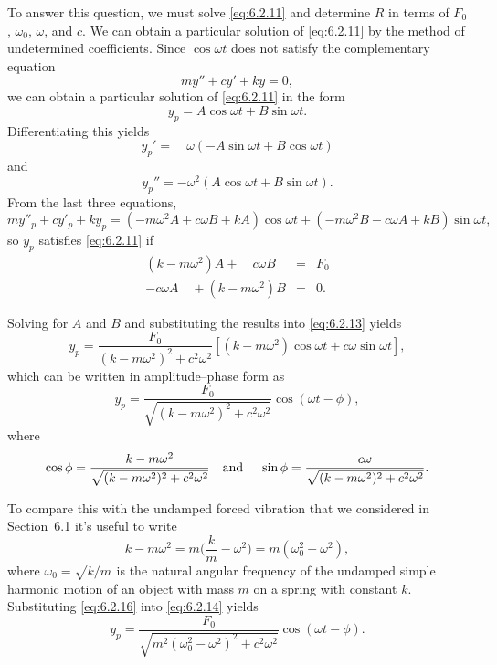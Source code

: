  To answer this question, we must solve \eqref{eq:6.2.11} and determine $R$ in terms of
$F_{0}$, $\omega_{0}$, $\omega$, and $c$. We can obtain a particular solution of \eqref{eq:6.2.11}
by the method of undetermined coefficients. Since $\cos\omega t$ does not satisfy the complementary
equation
\[
  my''+cy'+ky=0,
\]
we can obtain a particular solution of \eqref{eq:6.2.11} in the form
\begin{equation}
  \label{eq:6.2.13}y_{p}=A\cos\omega t+B\sin\omega t.
\end{equation}
Differentiating this yields
\[
  y_{p}'=\quad\omega(-A\sin\omega t+B\cos\omega t)
\]
and
\[
  y_{p}''=-\omega^{2}(A\cos\omega t+B\sin\omega t).
\]
From the last three equations,
\[
  my''_{p}+cy'_{p}+ky_{p}=(-m\omega^{2}A+c\omega B+kA)\cos\omega t+ (-m\omega^{2}B-c\omega A+kB)\sin\omega t,
\]
so $y_{p}$ satisfies \eqref{eq:6.2.11} if
\[
  \begin{array}{lll}
    (k-m\omega^{2})A+\quad c\omega B & = & F_{0} \\
    -c\omega A\quad+(k-m\omega^{2})B & = & 0.
  \end{array}
\]

Solving for $A$ and $B$ and substituting the results into \eqref{eq:6.2.13} yields
\[
  y_{p}=\frac{F_{0}}{(k-m\omega^{2})^{2}+c^{2}\omega^{2}}\left[(k-m\omega^{2})\cos\omega t+c\omega\sin\omega t\right],
\]
which can be written in amplitude--phase form as
\begin{equation}
  \label{eq:6.2.14}%
  y_{p}=\frac{F_{0}}{\sqrt{(k-m\omega^{2})^{2}+c^{2}\omega^{2}}}\cos(\omega t-\phi),
\end{equation}
where
\begin{equation}
  \label{eq:6.2.15}\cos\phi=\frac{k-m\omega^{2}}{\sqrt{(k-m\omega^{2})^{2}+c^{2}\omega^{2}}}\mbox{\quad and \quad}\sin\phi=\frac{c\omega}{\sqrt{(k-m\omega^{2})^{2}+c^{2}\omega^{2}}}.
\end{equation}

To compare this with the undamped forced vibration that we considered in Section~6.1 it's useful to
write
\begin{equation}
  \label{eq:6.2.16}k-m\omega^{2}=m\bigg(\frac{k}{m}-\omega^{2}\bigg)= m(\omega_{0}^{2}-\omega^{2}),
\end{equation}
where $\omega_{0}=\sqrt{k/m}$ is the natural angular frequency of the undamped simple harmonic
motion of an object with mass $m$ on a spring with constant $k$. Substituting \eqref{eq:6.2.16} into
\eqref{eq:6.2.14} yields
\begin{equation}
  \label{eq:6.2.17}y_{p}=\frac{F_{0}}{\sqrt{m^{2}(\omega^{2}_{0}-\omega^{2})^{2}+ c^{2}\omega^{2}}}\cos(\omega t-\phi).
\end{equation}

